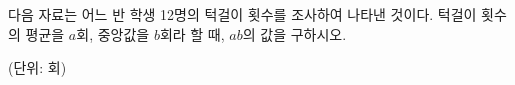 다음 자료는 어느 반 학생 12명의 턱걸이 횟수를 조사하여 나타낸 것이다. 턱걸이 횟수의 평균을 $a$회, 중앙값을 $b$회라 할 때, $ab$의 값을 구하시오.\par\noindent\hfill{\footnotesize (단위: 회)}
